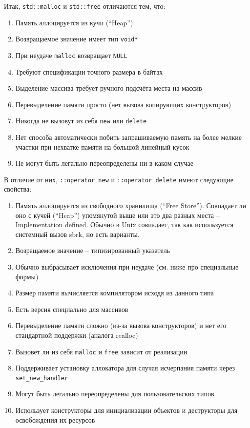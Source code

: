 \documentclass[a4paper,12pt,oneside]{article}
\begin{document}
Итак, \lstinline!std::malloc! и \lstinline!std::free! отличаются тем, что:

\begin{enumerate}
\item
Память аллоцируется из кучи (``Heap'')
\item
Возвращаемое значение имеет тип \lstinline!void*!
\item
При неудаче \lstinline!malloc! возвращает \lstinline!NULL!
\item
Требуют спецификации точного размера в байтах
\item
Выделение массива требует ручного подсчёта места на массив
\item
Перевыделение памяти просто (нет вызова копирующих конструкторов)
\item
Никогда не вызовут из себя \lstinline!new! или \lstinline!delete!
\item
Нет способа автоматически побить запрашиваемую память на более мелкие участки при нехватке памяти на большой линейный кусок
\item
Не могут быть легально переопределены ни в каком случае
\end{enumerate}

В отличие от них, \lstinline!::operator new! и \lstinline!::operator delete! имеют следующие свойства:

\begin{enumerate}
\item
Память аллоцируется из свободного хранилища (``Free Store''). Совпадает ли оно с кучей (``Heap'') упомянутой выше или это два разных места -- Implementation defined. Обычно в Unix совпадает, так как используется системный вызов sbrk, но есть варианты.
\item
Возращаемое значение -- типизированный указатель
\item
Обычно выбрасывает исключения при неудаче (см. ниже про специальные формы)
\item
Размер памяти вычисляется компилятором исходя из данного типа
\item
Есть версия специально для массивов
\item
Перевыделение памяти сложно (из-за вызова конструкторов) и нет его стандартной поддержки (аналога realloc)
\item
Вызовет ли из себя \lstinline!malloc! и \lstinline!free! зависит от реализации
\item
Поддерживает установку аллокатора для случая исчерпания памяти через \lstinline!set_new_handler!
\item
Могут быть легально переопределены для пользовательских типов
\item
Использует конструкторы для инициализации объектов и деструкторы для освобождения их ресурсов
\end{enumerate}
\end{document}
